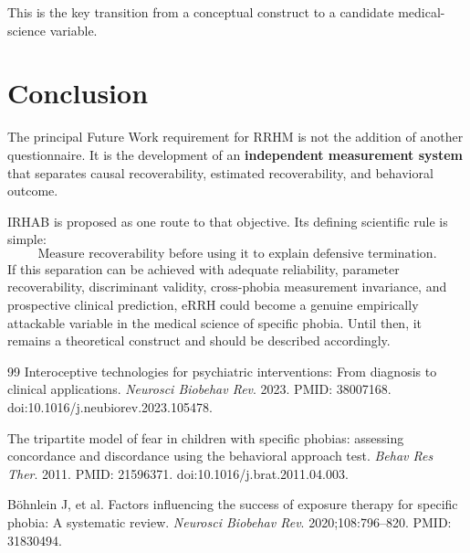\documentclass[11pt]{article}
\begin{document}
This is the key transition from a conceptual construct to a candidate medical-science variable.

\section{Conclusion}
The principal Future Work requirement for RRHM is not the addition of another questionnaire. It is the development of an \textbf{independent measurement system} that separates causal recoverability, estimated recoverability, and behavioral outcome.

IRHAB is proposed as one route to that objective. Its defining scientific rule is simple:
\[
\boxed{\text{Measure recoverability before using it to explain defensive termination.}}
\]
If this separation can be achieved with adequate reliability, parameter recoverability, discriminant validity, cross-phobia measurement invariance, and prospective clinical prediction, eRRH could become a genuine empirically attackable variable in the medical science of specific phobia. Until then, it remains a theoretical construct and should be described accordingly.

\begin{thebibliography}{99}
Interoceptive technologies for psychiatric interventions: From diagnosis to clinical applications. \emph{Neurosci Biobehav Rev}. 2023. PMID: 38007168. doi:10.1016/j.neubiorev.2023.105478.

The tripartite model of fear in children with specific phobias: assessing concordance and discordance using the behavioral approach test. \emph{Behav Res Ther}. 2011. PMID: 21596371. doi:10.1016/j.brat.2011.04.003.

B\"ohnlein J, et al. Factors influencing the success of exposure therapy for specific phobia: A systematic review. \emph{Neurosci Biobehav Rev}. 2020;108:796--820. PMID: 31830494.
\end{thebibliography}
\end{document}
